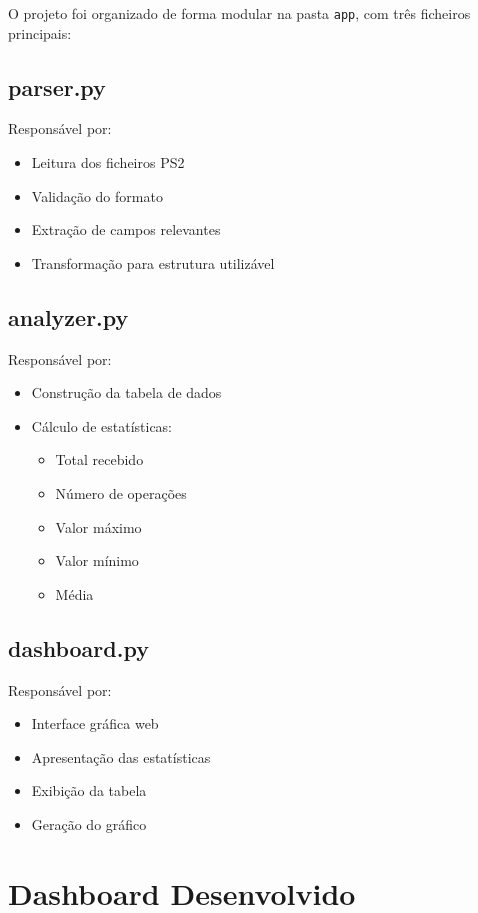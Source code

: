 \documentclass[12pt]{article}
\begin{document}
O projeto foi organizado de forma modular na pasta \texttt{app}, com três ficheiros principais:

\subsection{parser.py}

Responsável por:
\begin{itemize}
\item Leitura dos ficheiros PS2
\item Validação do formato
\item Extração de campos relevantes
\item Transformação para estrutura utilizável
\end{itemize}

\subsection{analyzer.py}

Responsável por:
\begin{itemize}
\item Construção da tabela de dados
\item Cálculo de estatísticas:
\begin{itemize}
\item Total recebido
\item Número de operações
\item Valor máximo
\item Valor mínimo
\item Média
\end{itemize}
\end{itemize}

\subsection{dashboard.py}

Responsável por:
\begin{itemize}
\item Interface gráfica web
\item Apresentação das estatísticas
\item Exibição da tabela
\item Geração do gráfico
\end{itemize}

\section{Dashboard Desenvolvido}
\end{document}
